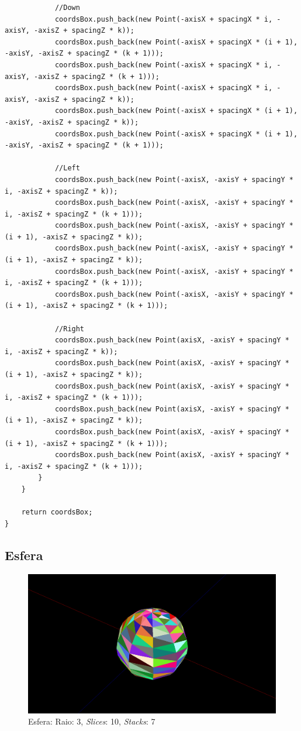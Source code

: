 \documentclass[a4paper]{article}
\begin{document}
\begin{lstlisting}
            //Down
            coordsBox.push_back(new Point(-axisX + spacingX * i, -axisY, -axisZ + spacingZ * k));
            coordsBox.push_back(new Point(-axisX + spacingX * (i + 1), -axisY, -axisZ + spacingZ * (k + 1)));
            coordsBox.push_back(new Point(-axisX + spacingX * i, -axisY, -axisZ + spacingZ * (k + 1)));
            coordsBox.push_back(new Point(-axisX + spacingX * i, -axisY, -axisZ + spacingZ * k));
            coordsBox.push_back(new Point(-axisX + spacingX * (i + 1), -axisY, -axisZ + spacingZ * k));
            coordsBox.push_back(new Point(-axisX + spacingX * (i + 1), -axisY, -axisZ + spacingZ * (k + 1)));

            //Left
            coordsBox.push_back(new Point(-axisX, -axisY + spacingY * i, -axisZ + spacingZ * k));
            coordsBox.push_back(new Point(-axisX, -axisY + spacingY * i, -axisZ + spacingZ * (k + 1)));
            coordsBox.push_back(new Point(-axisX, -axisY + spacingY * (i + 1), -axisZ + spacingZ * k));
            coordsBox.push_back(new Point(-axisX, -axisY + spacingY * (i + 1), -axisZ + spacingZ * k));
            coordsBox.push_back(new Point(-axisX, -axisY + spacingY * i, -axisZ + spacingZ * (k + 1)));
            coordsBox.push_back(new Point(-axisX, -axisY + spacingY * (i + 1), -axisZ + spacingZ * (k + 1)));

            //Right
            coordsBox.push_back(new Point(axisX, -axisY + spacingY * i, -axisZ + spacingZ * k));
            coordsBox.push_back(new Point(axisX, -axisY + spacingY * (i + 1), -axisZ + spacingZ * k));
            coordsBox.push_back(new Point(axisX, -axisY + spacingY * i, -axisZ + spacingZ * (k + 1)));
            coordsBox.push_back(new Point(axisX, -axisY + spacingY * (i + 1), -axisZ + spacingZ * k));
            coordsBox.push_back(new Point(axisX, -axisY + spacingY * (i + 1), -axisZ + spacingZ * (k + 1)));
            coordsBox.push_back(new Point(axisX, -axisY + spacingY * i, -axisZ + spacingZ * (k + 1)));
        }
    }

    return coordsBox;
}
\end{lstlisting}
\subsection{Esfera}

\begin{figure}[H]
\centering
\includegraphics[width=0.5\linewidth]{sphere.png}
\caption{Esfera: Raio: 3, \textit{Slices}: 10, \textit{Stacks}: 7}
\end{figure}
\end{document}
